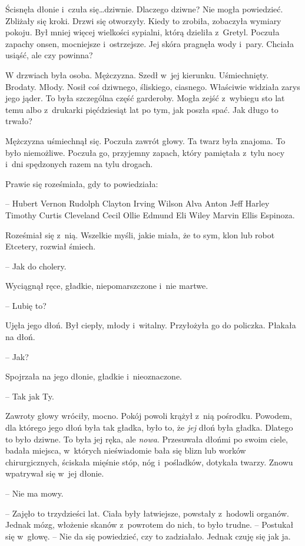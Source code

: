 \documentclass[oneside,polish,11pt,sfheadings]{mwbk}
\begin{document}
Ścisnęła dłonie i~czuła się\ldots  dziwnie. Dlaczego dziwne? Nie mogła
powiedzieć. Zbliżały się kroki. Drzwi się otworzyły. Kiedy to zrobiła,
zobaczyła wymiary pokoju. Był mniej więcej wielkości sypialni, którą
dzieliła z~Gretyl. Poczuła zapachy onsen, mocniejsze i~ostrzejsze. Jej
skóra pragnęła wody i~pary. Chciała usiąść, ale czy powinna?

W drzwiach była osoba. Mężczyzna. Szedł w~jej kierunku. Uśmiechnięty.
Brodaty. Młody. Nosił coś dziwnego, śliskiego, ciasnego. Właściwie
widziała zarys jego jąder. To była szczególna część garderoby. Mogła
zejść z~wybiegu sto lat temu albo z~drukarki pięćdziesiąt lat po tym,
jak poszła spać. Jak długo to trwało?

Mężczyzna uśmiechnął się. Poczuła zawrót głowy. Ta twarz była znajoma.
To było niemożliwe. Poczuła go, przyjemny zapach, który pamiętała z~tylu
nocy i~dni spędzonych razem na tylu drogach.

Prawie się roześmiała, gdy to powiedziała: 

-- Hubert Vernon Rudolph
Clayton Irving Wilson Alva Anton Jeff Harley Timothy Curtis Cleveland
Cecil Ollie Edmund Eli Wiley Marvin Ellis Espinoza. 

Roześmiał się z~nią.
Wszelkie myśli, jakie miała, że to sym, klon lub robot Etcetery, rozwiał
śmiech.

-- Jak do cholery.

Wyciągnął ręce, gładkie, niepomarszczone i~nie martwe.

-- Lubię to?

Ujęła jego dłoń. Był ciepły, młody i~witalny. Przyłożyła go do policzka.
Płakała na dłoń. 

-- Jak?

Spojrzała na jego dłonie, gładkie i~nieoznaczone.

-- Tak jak Ty. 

Zawroty głowy wróciły, mocno. Pokój powoli krążył z~nią
pośrodku. Powodem, dla którego jego dłoń była tak gładka, było to, że
\textit{jej} dłoń była gładka. Dlatego to było dziwne. To była jej ręka,
ale \textit{nowa}. Przesuwała dłońmi po swoim ciele, badała miejsca, w~których nieświadomie bała się blizn lub worków chirurgicznych, ściskała
mięśnie stóp, nóg i~pośladków, dotykała twarzy. Znowu wpatrywał się w~jej dłonie.

-- Nie ma mowy.

-- Zajęło to trzydzieści lat. Ciała były łatwiejsze, powstały z~hodowli
organów. Jednak mózg, włożenie skanów z~powrotem do nich, to było
trudne. -- Postukał się w~głowę. -- Nie da się powiedzieć, czy to
zadziałało. Jednak czuję się jak ja.
\end{document}
